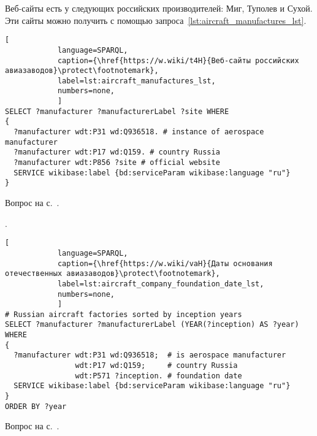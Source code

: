 \hfil{}\hfil%



\newpage
\begin{task}
    \label{answer:aircraft_manufacturers}
    Веб-сайты есть у следующих российских производителей: 
    Миг, Туполев и Сухой. 
    Эти сайты можно получить с помощью запроса~\ref{lst:aircraft_manufactures_lst}. 

\begin{lstlisting}[ 
            language=SPARQL, 
            caption={\href{https://w.wiki/t4H}{Веб-сайты российских авиазаводов}\protect\footnotemark}, 
            label=lst:aircraft_manufactures_lst, 
            numbers=none,
            ]
SELECT ?manufacturer ?manufacturerLabel ?site WHERE
{
  ?manufacturer wdt:P31 wd:Q936518. # instance of aerospace manufacturer
  ?manufacturer wdt:P17 wd:Q159. # country Russia
  ?manufacturer wdt:P856 ?site # official website
  SERVICE wikibase:label {bd:serviceParam wikibase:language "ru"}
}
\end{lstlisting}
    
    \small{\AnswerBackref Вопрос на с.~\pageref{lst:lang2}.}
\end{task}

\begin{task}
    \label{answer:aircraft_company_foundation_date}
    . 
    
	\begin{lstlisting}[ 
            language=SPARQL, 
            caption={\href{https://w.wiki/vaH}{Даты основания отечественных авиазаводов}\protect\footnotemark}, 
            label=lst:aircraft_company_foundation_date_lst, 
            numbers=none,
            ]
# Russian aircraft factories sorted by inception years
SELECT ?manufacturer ?manufacturerLabel (YEAR(?inception) AS ?year) WHERE 
{
  ?manufacturer wdt:P31 wd:Q936518;  # is aerospace manufacturer
                wdt:P17 wd:Q159;     # country Russia
                wdt:P571 ?inception. # foundation date
  SERVICE wikibase:label {bd:serviceParam wikibase:language "ru"}
}
ORDER BY ?year
\end{lstlisting}
    
    \small{\AnswerBackref Вопрос на с.~\pageref{aircraft_question_2}.}
\end{task}

